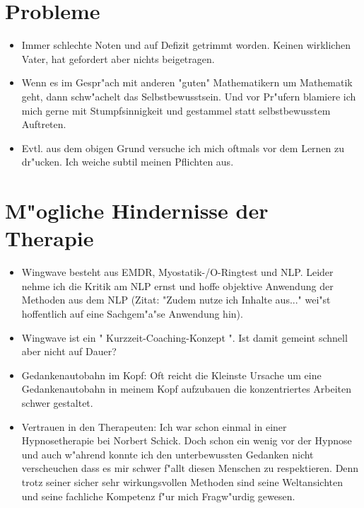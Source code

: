 \documentclass[11pt,a4paper,german]{article}
\begin{document}
\section{Probleme}
\begin{itemize}
	\item Immer schlechte Noten und auf Defizit getrimmt worden. Keinen wirklichen Vater, hat gefordert aber nichts beigetragen.
	\item Wenn es im Gespr"ach mit anderen "{}guten"{} Mathematikern um Mathematik geht, dann schw"achelt das Selbstbewusstsein. Und vor Pr"ufern blamiere ich mich gerne mit Stumpfsinnigkeit und gestammel statt selbstbewusstem Auftreten.
	\item Evtl. aus dem obigen Grund versuche ich mich oftmals vor dem Lernen zu dr"ucken. Ich weiche subtil meinen Pflichten aus.
\end{itemize}

\section{M"ogliche Hindernisse der Therapie}
\begin{itemize}
	\item Wingwave besteht aus EMDR, Myostatik-/O-Ringtest und NLP. Leider nehme ich die Kritik am NLP ernst und hoffe objektive Anwendung der Methoden aus dem NLP (Zitat: "{}Zudem nutze ich Inhalte aus..."{} wei"st hoffentlich auf eine Sachgem"a"se Anwendung hin).
	\item Wingwave ist ein "{} Kurzzeit-Coaching-Konzept "{}. Ist damit gemeint schnell aber nicht auf Dauer?
	\item Gedankenautobahn im Kopf: Oft reicht die Kleinste Ursache um eine Gedankenautobahn in meinem Kopf aufzubauen die konzentriertes Arbeiten schwer gestaltet.
	\item Vertrauen in den Therapeuten: Ich war schon einmal in einer Hypnosetherapie bei Norbert Schick. Doch schon ein wenig vor der Hypnose und auch w"ahrend konnte ich den unterbewussten Gedanken nicht verscheuchen dass es mir schwer f"allt diesen Menschen zu respektieren. Denn trotz seiner sicher sehr wirkungsvollen Methoden sind seine Weltansichten und seine fachliche Kompetenz f"ur mich Fragw"urdig gewesen.
\end{itemize}
\end{document}

